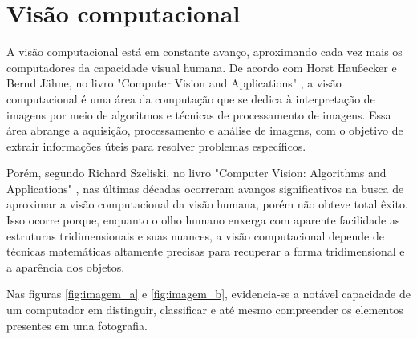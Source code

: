 \section{Visão computacional}

A visão computacional está em constante avanço, aproximando cada vez mais os computadores da capacidade visual humana. De acordo com Horst Haußecker e Bernd Jähne, no livro "Computer Vision and Applications" \cite{comp_vision_and_applications}, a visão computacional é uma área da computação que se dedica à interpretação de imagens por meio de algoritmos e técnicas de processamento de imagens. Essa área abrange a aquisição, processamento e análise de imagens, com o objetivo de extrair informações úteis para resolver problemas específicos.

Porém, segundo Richard Szeliski, no livro "Computer Vision: Algorithms and Applications" \cite{computer_vision_richard}, nas últimas décadas ocorreram avanços significativos na busca de aproximar a visão computacional da visão humana, porém não obteve total êxito. Isso ocorre porque, enquanto o olho humano enxerga com aparente facilidade as estruturas tridimensionais e suas nuances, a visão computacional depende de técnicas matemáticas altamente precisas para recuperar a forma tridimensional e a aparência dos objetos.

Nas figuras \cref{fig:imagem_a} e \cref{fig:imagem_b}, evidencia-se a notável capacidade de um computador em distinguir, classificar e até mesmo compreender os elementos presentes em uma fotografia.

